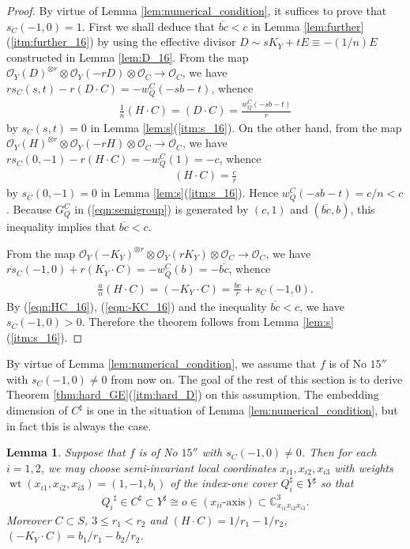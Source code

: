 \documentclass[a4paper,11pt]{amsart}
\newtheorem{lemma}[theorem]{Lemma}
\theoremstyle{definition}
\theoremstyle{remark}
\numberwithin{equation}{section}
\newcommand{\bC}{{\mathbb C}}
\newcommand{\cO}{{\mathcal O}}
\newcommand{\axis}{\textrm{-}\mathrm{axis}}
\newcommand{\wt}{\operatorname{wt}}
\begin{document}
\begin{proof}
By virtue of Lemma \ref{lem:numerical_condition},
it suffices to prove that $s_C(-1,0)=1$.
First we shall deduce that $\overline{bc}<c$
in Lemma \ref{lem:further}(\ref{itm:further_16})
by using the effective divisor $D \sim sK_Y+tE \equiv -(1/n)E$
constructed in Lemma \ref{lem:D_16}.
From the map
$\cO_Y(D)^{\otimes r} \otimes \cO_Y(-rD) \otimes \cO_C \to \cO_C$,
we have $rs_C(s,t)-r(D \cdot C)=-w_Q^C(-sb-t)$,
whence
\begin{align*}
\frac{1}{n}(H \cdot C)=(D \cdot C)=\frac{w_Q^C(-sb-t)}{r}
\end{align*}
by $s_C(s,t)=0$ in Lemma \ref{lem:s}(\ref{itm:s_16}).
On the other hand, from the map
$\cO_Y(H)^{\otimes r} \otimes \cO_Y(-rH) \otimes \cO_C \to \cO_C$,
we have $rs_C(0,-1)-r(H \cdot C)=-w_Q^C(1)=-c$,
whence
\begin{align}\label{eqn:HC_16}
(H \cdot C)=\frac{c}{r}
\end{align}
by $s_C(0,-1)=0$ in Lemma \ref{lem:s}(\ref{itm:s_16}).
Hence $w_Q^C(-sb-t)=c/n<c$.
Because $G_Q^C$ in (\ref{eqn:semigroup}) is generated by
$(c,1)$ and $(\overline{bc},b)$,
this inequality implies that $\overline{bc}<c$.

From the map
$\cO_Y(-K_Y)^{\otimes r} \otimes \cO_Y(rK_Y) \otimes \cO_C \to \cO_C$,
we have $rs_C(-1,0)+r(K_Y \cdot C)=-w_Q^C(b)=-\overline{bc}$,
whence
\begin{align}\label{eqn:-KC_16}
\frac{a}{n}(H \cdot C)=(-K_Y \cdot C)=\frac{\overline{bc}}{r}+s_C(-1,0).
\end{align}
By (\ref{eqn:HC_16}), (\ref{eqn:-KC_16}) and the inequality $\overline{bc}<c$,
we have $s_C(-1,0)>0$.
Therefore the theorem follows from Lemma \ref{lem:s}(\ref{itm:s_16}).
\end{proof}

By virtue of Lemma \ref{lem:numerical_condition},
we assume that $f$ is of No $\textrm{15}''$ with $s_C(-1,0)\neq0$ from now on.
The goal of the rest of this section is to derive
Theorem \ref{thm:hard_GE}(\ref{itm:hard_D}) on this assumption.
The embedding dimension of $C^\sharp$ is one
in the situation of Lemma \ref{lem:numerical_condition},
but in fact this is always the case.

\begin{lemma}\label{lem:true/false}
Suppose that $f$ is of No $\textrm{15}''$ with $s_C(-1,0)\neq0$.
Then for each $i=1,2$,
we may choose semi-invariant local coordinates
$x_{i1},x_{i2},x_{i3}$ with weights $\wt(x_{i1},x_{i2},x_{i3})=(1,-1,b_i)$
of the index-one cover $Q_i^\sharp \in Y^\sharp$ so that
\begin{align*}
{Q_i}^\sharp \in C^\sharp \subset Y^\sharp
\cong o \in (x_{ii}\axis) \subset \bC^3_{x_{i1}x_{i2}x_{i3}}.
\end{align*}
Moreover $C \subset S$, $3\le r_1<r_2$
and $(H \cdot C)=1/r_1-1/r_2$, $(-K_Y \cdot C)=b_1/r_1-b_2/r_2$.
\end{lemma}
\end{document}
